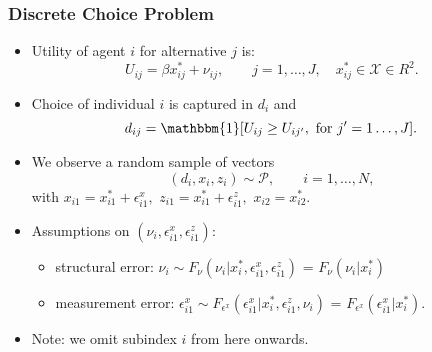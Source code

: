 \begin{frame}
\frametitle{Discrete Choice Problem}

\begin{itemize}
	\item Utility of agent $i$ for alternative $j$ is:
	\begin{equation*}
	U_{ij}=\beta x^{*}_{ij} + \nu_{ij},\qquad  j = 1,\dots,J,\quad x^{*}_{ij}\in\mathcal{X}\in R^{2}.
	\end{equation*}
	\item Choice of individual $i$ is captured in $d_{i}$ and
	\begin{equation*}
	d_{ij} = \mathbbm{1}[U_{ij}\geq U_{ij'},\text{ for $j'=1\dots,J$}].
	\end{equation*}
	\item We observe a random sample of vectors
	\begin{equation*}
	(d_{i},x_{i},z_{i})\sim\mathcal{P},\qquad i = 1,\dots,N,
	\end{equation*}
	with $x_{i1}=x^{*}_{i1}+\epsilon^{x}_{i1},$ $z_{i1}=x^{*}_{i1} + \epsilon^{z}_{i1},$ $x_{i2}=x^{*}_{i2}$.
	\item Assumptions on $(\nu_{i},\epsilon^{x}_{i1},\epsilon^{z}_{i1})$:
	\begin{itemize}
	\item structural error: $\nu_{i}\sim F_{\nu}(\nu_{i}|x_{i}^{*},\epsilon_{i1}^{x},\epsilon_{i1}^{z})$ = $F_{\nu}(\nu_{i}|x_{i}^{*})$
	\item measurement error: $\epsilon^{x}_{i1}\sim F_{\epsilon^{x}}(\epsilon_{i1}^{x}|x_{i}^{*},\epsilon_{i1}^{z},\nu_{i})$ = $F_{\epsilon^{x}}(\epsilon_{i1}^{x}|x_{i}^{*})$.
	\end{itemize}
	\item Note: we omit subindex $i$ from here onwards.
\end{itemize}
\end{frame}
